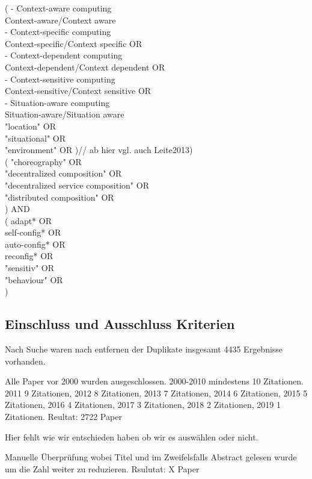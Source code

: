 \documentclass[conference,compsoc]{IEEEtran}
\begin{document}
(
- Context-aware computing\\
	Context-aware/Context aware\\
- Context-specific computing\\
	Context-specific/Context specific OR\\
- Context-dependent computing\\
	Context-dependent/Context dependent OR\\
- Context-sensitive computing\\
	Context-sensitive/Context sensitive OR\\
- Situation-aware computing\\
	Situation-aware/Situation aware\\
"location" OR\\
"situational" OR\\
"environment" OR
)//
ab hier vgl. auch Leite2013) \\
 (
 "choreography" OR\\
"decentralized composition" OR\\
"decentralized service composition" OR\\
"distributed composition" OR\\
) AND\\
(
adapt* OR\\
self-config* OR\\
auto-config* OR\\
reconfig* OR\\
"sensitiv" OR\\
"behaviour" OR\\
)\\

\subsection{Einschluss und Ausschluss Kriterien}
Nach Suche waren nach entfernen der Duplikate insgesamt 4435 Ergebnisse vorhanden.

Alle Paper vor 2000 wurden ausgeschlossen. 2000-2010 mindestens 10 Zitationen. 2011 9 Zitationen, 2012 8 Zitationen, 2013 7 Zitationen, 2014 6 Zitationen, 2015 5 Zitationen, 2016 4 Zitationen, 2017 3 Zitationen, 2018 2 Zitationen, 2019 1 Zitationen. Reultat: 2722 Paper

Hier fehlt wie wir entschieden haben ob wir es auswählen oder nicht.

Manuelle Überprüfung wobei Titel und im Zweifelsfalls Abstract gelesen wurde um die Zahl weiter zu reduzieren. Rsulutat: X Paper
\end{document}
